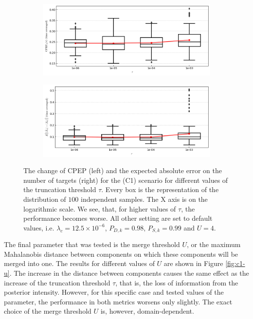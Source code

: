 \begin{figure}
    \centering
    \begin{subfigure}[]{0.48\linewidth}
        \centering
        \includegraphics[width=\linewidth]{figures/c1-prune-cpep.png}
    \end{subfigure}
    \hfill
    \begin{subfigure}[]{0.48\linewidth}
        \centering
        \includegraphics[width=\linewidth]{figures/c1-prune-eae.png}
    \end{subfigure}
  \caption[(C1). Change of performance depending on the prune threshold.]{The change of CPEP (left) and the expected absolute error on the number of targets (right) for the (C1) scenario for different values of the truncation threshold $\tau$. Every box is the representation of the distribution of $100$ independent samples. The X axis is on the logarithmic scale. We see, that, for higher values of $\tau$, the performance becomes worse. All other setting are set to default values, i.e. $\lambda_{c} = 12.5 \times 10^{-6}$, $P_{D,k} = 0.98$, $P_{S,k} = 0.99$ and $U = 4$.}
  \label{fig:c1-tau}
\end{figure}

The final parameter that was tested is the merge threshold $U$, or the maximum Mahalanobis distance between components on which these components will be merged into one. The results for different values of $U$ are shown in Figure \ref{fig:c1-u}. The increase in the distance between components causes the same effect as the increase of the truncation threshold $\tau$, that is, the loss of information from the posterior intensity. However, for this specific case and tested values of the parameter, the performance in both metrics worsens only slightly. The exact choice of the merge threshold $U$ is, however, domain-dependent.

